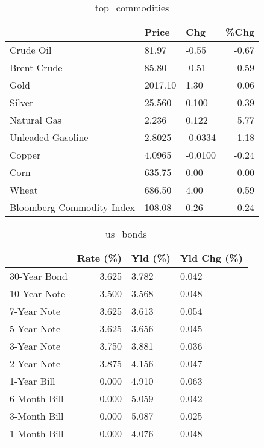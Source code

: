 \documentclass{article}%
\begin{document}
\begin{table}[htbp]%
\caption{top\_commodities}%
\centering%
\begin{adjustbox}{width=1\textwidth}%
\begin{tabular}{lllr}
\toprule
                          &   Price &     Chg &  \%Chg \\
\midrule
               Crude Oil  &   81.97 &   -0.55 & -0.67 \\
             Brent Crude  &   85.80 &   -0.51 & -0.59 \\
                    Gold  & 2017.10 &    1.30 &  0.06 \\
                  Silver  &  25.560 &   0.100 &  0.39 \\
             Natural Gas  &   2.236 &   0.122 &  5.77 \\
       Unleaded Gasoline  &  2.8025 & -0.0334 & -1.18 \\
                  Copper  &  4.0965 & -0.0100 & -0.24 \\
                    Corn  &  635.75 &    0.00 &  0.00 \\
                   Wheat  &  686.50 &    4.00 &  0.59 \\
Bloomberg Commodity Index &  108.08 &    0.26 &  0.24 \\
\bottomrule
\end{tabular}
%
\end{adjustbox}%
\end{table}

%


\begin{table}[htbp]%
\caption{us\_bonds}%
\centering%
\begin{adjustbox}{width=1\textwidth}%
\begin{tabular}{lrll}
\toprule
             &  Rate (\%) & Yld (\%) & Yld Chg (\%) \\
\midrule
30-Year Bond &     3.625 &   3.782 &       0.042 \\
10-Year Note &     3.500 &   3.568 &       0.048 \\
 7-Year Note &     3.625 &   3.613 &       0.054 \\
 5-Year Note &     3.625 &   3.656 &       0.045 \\
 3-Year Note &     3.750 &   3.881 &       0.036 \\
 2-Year Note &     3.875 &   4.156 &       0.047 \\
 1-Year Bill &     0.000 &   4.910 &       0.063 \\
6-Month Bill &     0.000 &   5.059 &       0.042 \\
3-Month Bill &     0.000 &   5.087 &       0.025 \\
1-Month Bill &     0.000 &   4.076 &       0.048 \\
\bottomrule
\end{tabular}
%
\end{adjustbox}%
\end{table}
\end{document}
